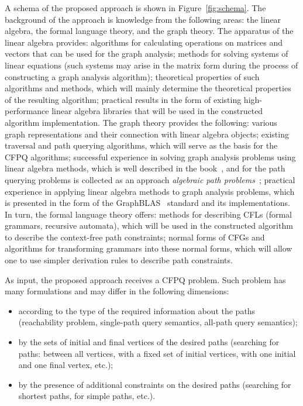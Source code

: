 A schema of the proposed approach is shown in Figure~\ref{fig:schema}. The background of the approach is knowledge from the following areas: the linear algebra, the formal language theory, and the graph theory. The apparatus of the linear algebra provides: algorithms for calculating operations on matrices and vectors that can be used for the graph analysis; methods for solving systems of linear equations (such systems may arise in the matrix form during the process of constructing a graph analysis algorithm); theoretical properties of such algorithms and methods, which will mainly determine the theoretical properties of the resulting algorithm; practical results in the form of existing high-performance linear algebra libraries that will be used in the constructed algorithm implementation. The graph theory provides the following: various graph representations and their connection with linear algebra objects; existing traversal and path querying algorithms, which will serve as the basis for the CFPQ algorithms; successful experience in solving graph analysis problems using linear algebra methods, which is well described in the book~\cite{kepner2011graph}, and for the path querying problems is collected as an approach \textit{algebraic path problems}~\cite{rote1990path,baras2010path, chen1992parallel,lengauer1991unstructured}; practical experience in applying linear algebra methods to graph analysis problems, which is presented in the form of the GraphBLAS~\cite{graphblas} standard and its implementations. In turn, the formal language theory offers: methods for describing CFLs (formal grammars, recursive automata), which will be used in the constructed algorithm to describe the context-free path constraints; normal forms of CFGs and algorithms for transforming grammars into these normal forms, which will allow one to use simpler derivation rules to describe path constraints.

As input, the proposed approach receives a CFPQ problem. Such problem has many formulations and may differ in the following dimensions:
\begin{itemize}
    \item according to the type of the required information about the paths (reachability problem, single-path query semantics, all-path query semantics);
    \item by the sets of initial and final vertices of the desired paths (searching for paths: between all vertices, with a fixed set of initial vertices, with one initial and one final vertex, etc.);
    \item by the presence of additional constraints on the desired paths (searching for shortest paths, for simple paths, etc.).
\end{itemize}


